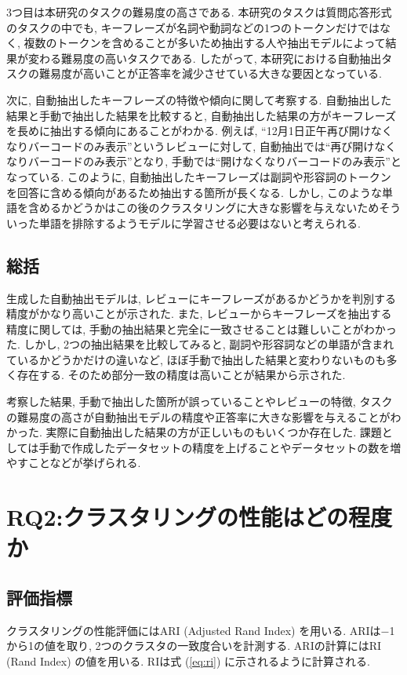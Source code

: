 3つ目は本研究のタスクの難易度の高さである. 本研究のタスクは質問応答形式のタスクの中でも, キーフレーズが名詞や動詞などの1つのトークンだけではなく, 複数のトークンを含めることが多いため抽出する人や抽出モデルによって結果が変わる難易度の高いタスクである. 
したがって, 本研究における自動抽出タスクの難易度が高いことが正答率を減少させている大きな要因となっている. 

次に, 自動抽出したキーフレーズの特徴や傾向に関して考察する. 
自動抽出した結果と手動で抽出した結果を比較すると, 自動抽出した結果の方がキーフレーズを長めに抽出する傾向にあることがわかる. 
例えば, ``12月1日正午再び開けなくなりバーコードのみ表示''というレビューに対して, 自動抽出では``再び開けなくなりバーコードのみ表示''となり, 手動では``開けなくなりバーコードのみ表示''となっている. 
このように, 自動抽出したキーフレーズは副詞や形容詞のトークンを回答に含める傾向があるため抽出する箇所が長くなる. しかし, このような単語を含めるかどうかはこの後のクラスタリングに大きな影響を与えないためそういった単語を排除するようモデルに学習させる必要はないと考えられる. 


\subsection{総括}
生成した自動抽出モデルは, レビューにキーフレーズがあるかどうかを判別する精度がかなり高いことが示された. 
また, レビューからキーフレーズを抽出する精度に関しては, 手動の抽出結果と完全に一致させることは難しいことがわかった. しかし, 2つの抽出結果を比較してみると, 副詞や形容詞などの単語が含まれているかどうかだけの違いなど, ほぼ手動で抽出した結果と変わりないものも多く存在する. そのため部分一致の精度は高いことが結果から示された. 

考察した結果, 手動で抽出した箇所が誤っていることやレビューの特徴, タスクの難易度の高さが自動抽出モデルの精度や正答率に大きな影響を与えることがわかった. 実際に自動抽出した結果の方が正しいものもいくつか存在した. 課題としては手動で作成したデータセットの精度を上げることやデータセットの数を増やすことなどが挙げられる. 


\section{RQ2:クラスタリングの性能はどの程度か}
\subsection{評価指標}
クラスタリングの性能評価にはARI (Adjusted Rand Index) を用いる. ARIは$-$1から1の値を取り, 2つのクラスタの一致度合いを計測する. 
ARIの計算にはRI (Rand Index) の値を用いる. RIは式 (\ref{eq:ri}) に示されるように計算される. 


